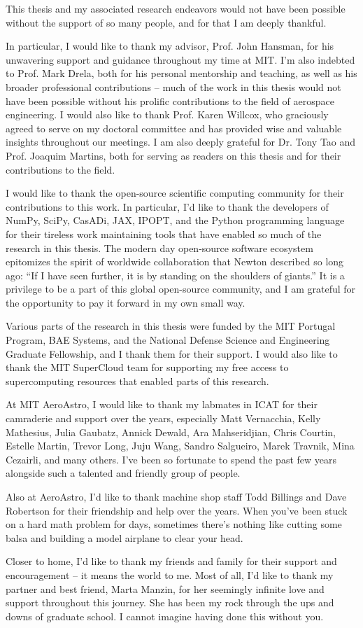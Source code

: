 This thesis and my associated research endeavors would not have been possible without the support of so many people, and for that I am deeply thankful.

In particular, I would like to thank my advisor, Prof. John Hansman, for his unwavering support and guidance throughout my time at MIT. I'm also indebted to Prof. Mark Drela, both for his personal mentorship and teaching, as well as his broader professional contributions -- much of the work in this thesis would not have been possible without his prolific contributions to the field of aerospace engineering. I would also like to thank Prof. Karen Willcox, who graciously agreed to serve on my doctoral committee and has provided wise and valuable insights throughout our meetings. I am also deeply grateful for Dr. Tony Tao and Prof. Joaquim Martins, both for serving as readers on this thesis and for their contributions to the field.

I would like to thank the open-source scientific computing community for their contributions to this work. In particular, I'd like to thank the developers of NumPy, SciPy, CasADi, JAX, IPOPT, and the Python programming language for their tireless work maintaining tools that have enabled so much of the research in this thesis. The modern day open-source software ecosystem epitomizes the spirit of worldwide collaboration that Newton described so long ago: ``If I have seen further, it is by standing on the shoulders of giants.'' It is a privilege to be a part of this global open-source community, and I am grateful for the opportunity to pay it forward in my own small way.

Various parts of the research in this thesis were funded by the MIT Portugal Program, BAE Systems, and the National Defense Science and Engineering Graduate Fellowship, and I thank them for their support. I would also like to thank the MIT SuperCloud team for supporting my free access to supercomputing resources that enabled parts of this research.

At MIT AeroAstro, I would like to thank my labmates in ICAT for their camraderie and support over the years, especially Matt Vernacchia, Kelly Mathesius, Julia Gaubatz, Annick Dewald, Ara Mahseridjian, Chris Courtin, Estelle Martin, Trevor Long, Juju Wang, Sandro Salgueiro, Marek Travnik, Mina Cezairli, and many others. I've been so fortunate to spend the past few years alongside such a talented and friendly group of people.

Also at AeroAstro, I'd like to thank machine shop staff Todd Billings and Dave Robertson for their friendship and help over the years. When you've been stuck on a hard math problem for days, sometimes there's nothing like cutting some balsa and building a model airplane to clear your head.


Closer to home, I'd like to thank my friends and family for their support and encouragement -- it means the world to me. Most of all, I'd like to thank my partner and best friend, Marta Manzin, for her seemingly infinite love and support throughout this journey. She has been my rock through the ups and downs of graduate school. I cannot imagine having done this without you.